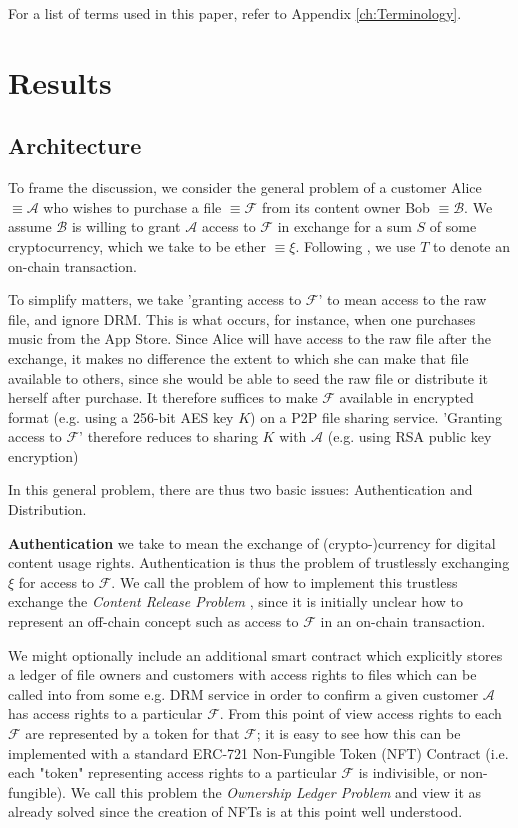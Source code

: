 \documentclass[12pt,oneside]{amsart}
\makeatletter
\def\file{\mathcal{F}}
\def\alice{\mathcal{A}}
\def\bob{\mathcal{B}}
\def\ether{\xi}
\def\crp{\textit{Content Release Problem} }
\def\olp{\textit{Ownership Ledger Problem} }
\newcommand*\eg{e.g.\@\xspace}
\newcommand*\ie{i.e.\@\xspace}
\makeatother
\begin{document}
\begin{multicols}{2}
For a list of terms used in this paper, refer to Appendix \ref{ch:Terminology}.

\section{Results} \label{ch:results}

\subsection{Architecture}


To frame the discussion, we consider the general problem of a customer Alice $\equiv \alice$ who wishes to purchase a file $\equiv \file$ from its content owner Bob $\equiv \bob$.
We assume $\bob$ is willing to grant $\alice$ access to $\file$ in exchange for a sum $S$ of some cryptocurrency, which we take to be ether $\equiv \ether$.
Following \cite{wood2015ethereum}, we use $T$ to denote an on-chain transaction.

To simplify matters, we take 'granting access to $\file$' to mean access to the raw file, and ignore DRM.
This is what occurs, for instance, when one purchases music from the App Store.
Since Alice will have access to the raw file after the exchange, it makes no difference the extent to which she can make that file available to others, since she would be able to seed the raw file or distribute it herself after purchase.
It therefore suffices to make $\file$ available in encrypted format (e.g. using a 256-bit AES key $K$) on a P2P file sharing service.
'Granting access to $\file$' therefore reduces to sharing $K$ with $\alice$ (e.g. using RSA public key encryption)

In this general problem, there are thus two basic issues: Authentication and Distribution.

\textbf{Authentication} we take to mean the exchange of (crypto-)currency for digital content usage rights.
Authentication is thus the problem of trustlessly exchanging $\ether$ for access to $\file$.
We call the problem of how to implement this trustless exchange the \crp, since it is initially unclear how to represent an off-chain concept such as access to $\file$ in an on-chain transaction.

We might optionally include an additional smart contract which explicitly stores a ledger of file owners and customers with access rights to files which can be called into from some \eg DRM service in order to confirm a given customer $\alice$ has access rights to a particular $\file$.
From this point of view access rights to each $\file$ are represented by a token for that $\file$; it is easy to see how this can be implemented with a standard ERC-721 Non-Fungible Token (NFT) Contract (\ie each "token" representing access rights to a particular $\file$ is indivisible, or non-fungible).
We call this problem the \olp and view it as already solved since the creation of NFTs is at this point well understood.


\end{multicols}
\end{document}

